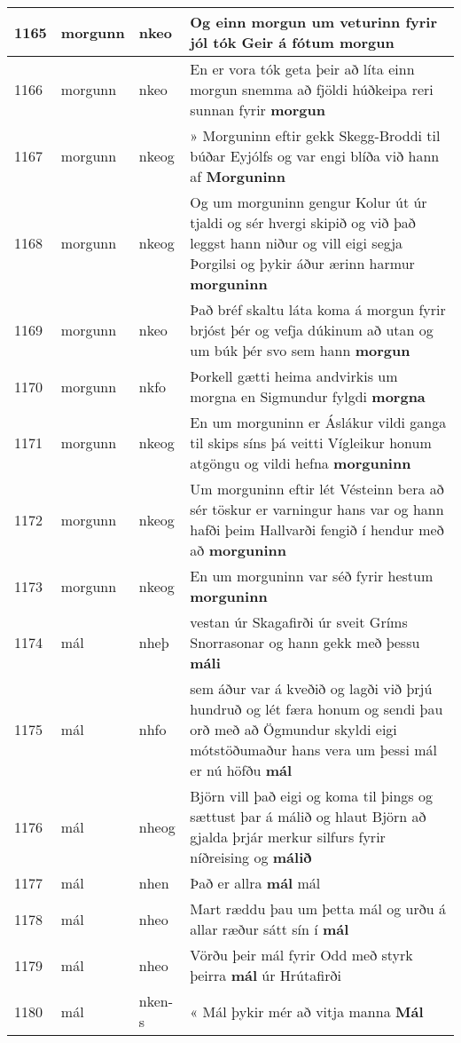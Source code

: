 \documentclass{article}
\begin{document}
\begin{longtable}{p{1cm}|p{1cm}|p{1cm}|p{13cm}}
\hline
1165&morgunn&nkeo&Og einn morgun um veturinn fyrir jól tók Geir á fótum \textbf{morgun} \\
\hline
1166&morgunn&nkeo&En er vora tók geta þeir að líta einn morgun snemma að fjöldi húðkeipa reri sunnan fyrir \textbf{morgun} \\
\hline
1167&morgunn&nkeog&» Morguninn eftir gekk Skegg-Broddi til búðar Eyjólfs og var engi blíða við hann af \textbf{Morguninn} \\
\hline
1168&morgunn&nkeog&Og um morguninn gengur Kolur út úr tjaldi og sér hvergi skipið og við það leggst hann niður og vill eigi segja Þorgilsi og þykir áður ærinn harmur \textbf{morguninn} \\
\hline
1169&morgunn&nkeo&Það bréf skaltu láta koma á morgun fyrir brjóst þér og vefja dúkinum að utan og um búk þér svo sem hann \textbf{morgun} \\
\hline
1170&morgunn&nkfo&Þorkell gætti heima andvirkis um morgna en Sigmundur fylgdi \textbf{morgna} \\
\hline
1171&morgunn&nkeog&En um morguninn er Áslákur vildi ganga til skips síns þá veitti Vígleikur honum atgöngu og vildi hefna \textbf{morguninn} \\
\hline
1172&morgunn&nkeog&Um morguninn eftir lét Vésteinn bera að sér töskur er varningur hans var og hann hafði þeim Hallvarði fengið í hendur með að \textbf{morguninn} \\
\hline
1173&morgunn&nkeog&En um morguninn var séð fyrir hestum \textbf{morguninn} \\
\hline
1174&mál&nheþ&vestan úr Skagafirði úr sveit Gríms Snorrasonar og hann gekk með þessu \textbf{máli} \\
\hline
1175&mál&nhfo&sem áður var á kveðið og lagði við þrjú hundruð og lét færa honum og sendi þau orð með að Ögmundur skyldi eigi mótstöðumaður hans vera um þessi mál er nú höfðu \textbf{mál} \\
\hline
1176&mál&nheog&Björn vill það eigi og koma til þings og sættust þar á málið og hlaut Björn að gjalda þrjár merkur silfurs fyrir níðreising og \textbf{málið} \\
\hline
1177&mál&nhen&Það er allra \textbf{mál} mál\\
\hline
1178&mál&nheo&Mart ræddu þau um þetta mál og urðu á allar ræður sátt sín í \textbf{mál} \\
\hline
1179&mál&nheo&Vörðu þeir mál fyrir Odd með styrk þeirra \textbf{mál} úr Hrútafirði\\
\hline
1180&mál&nken-s&« Mál þykir mér að vitja manna \textbf{Mál} \\

\end{longtable}
\end{document}
